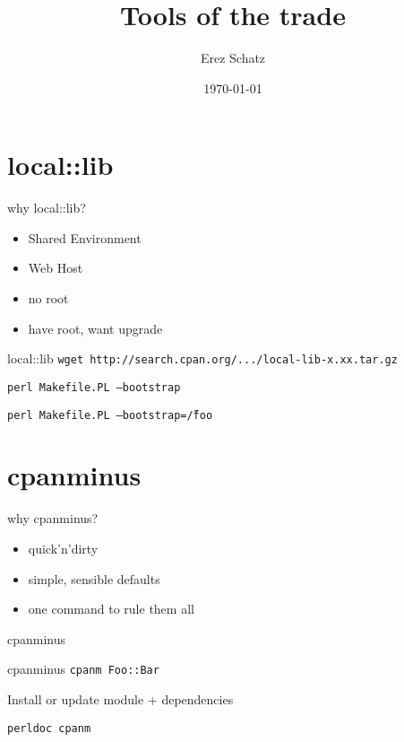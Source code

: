 \documentclass[
	mode=present,
	style=paintings,
	size=14pt,
	paper=screen
]{powerdot}
\title{Tools of the trade}
\author{Erez Schatz}
\date {\today}
\begin{document}
\maketitle

\section{local::lib}
\begin{slide}{why local::lib?}
	\begin{itemize}
	\item Shared Environment \par
	\item Web Host  \par
	\item no root \par
	\item have root, want upgrade
        \end{itemize}
\end{slide}
\begin{slide}{local::lib}
	\texttt{wget http://search.cpan.org/.../local-lib-x.xx.tar.gz} \par
	\texttt{perl Makefile.PL --bootstrap} \par
	\texttt{perl Makefile.PL --bootstrap=\~/foo}
\end{slide}
\section{cpanminus}
\begin{slide}{why cpanminus?}
        \begin{itemize}
        \item quick'n'dirty \par
        \item simple, sensible defaults \par
        \item one command to rule them all
        \end{itemize}
\end{slide}
\begin{slide}{cpanminus}
	\par \pause
         \par

\end{slide}
\begin{slide}{cpanminus}
        \texttt{cpanm Foo::Bar} \par \pause
        Install or update module + dependencies \par
        \texttt{perldoc cpanm}
\end{slide}
\end{document}
